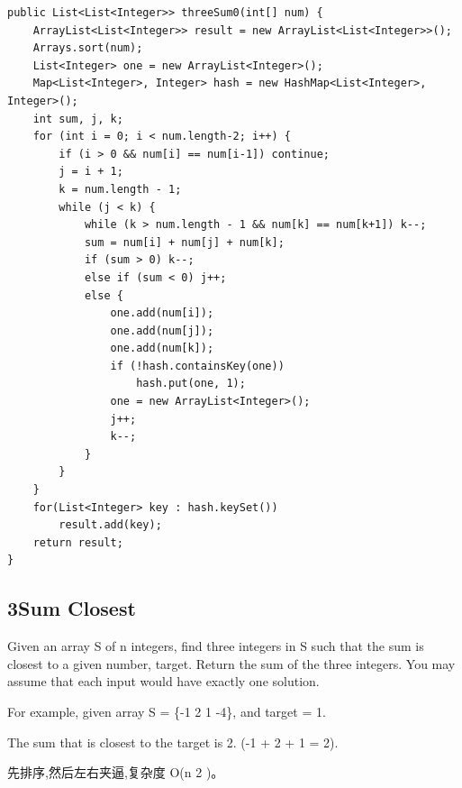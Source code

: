 \documentclass[12pt]{book}
\begin{document}
\lstset{language=java,label= ,caption= ,numbers=none}
\begin{lstlisting}
public List<List<Integer>> threeSum0(int[] num) {
    ArrayList<List<Integer>> result = new ArrayList<List<Integer>>();
    Arrays.sort(num);  
    List<Integer> one = new ArrayList<Integer>();
    Map<List<Integer>, Integer> hash = new HashMap<List<Integer>, Integer>();
    int sum, j, k;
    for (int i = 0; i < num.length-2; i++) {
        if (i > 0 && num[i] == num[i-1]) continue;
        j = i + 1;
        k = num.length - 1;
        while (j < k) {
            while (k > num.length - 1 && num[k] == num[k+1]) k--;
            sum = num[i] + num[j] + num[k];
            if (sum > 0) k--;
            else if (sum < 0) j++;
            else {
                one.add(num[i]);
                one.add(num[j]);
                one.add(num[k]);
                if (!hash.containsKey(one))
                    hash.put(one, 1);
                one = new ArrayList<Integer>();
                j++;
                k--;
            }
        }
    }
    for(List<Integer> key : hash.keySet()) 
        result.add(key);
    return result;
}
\end{lstlisting}

\subsection{3Sum Closest}
\label{sec-15-2-2}
Given an array S of n integers, find three integers in S such that the sum is closest to a given number, target. Return the sum of the three integers. You may assume that each input would have exactly one solution.

For example, given array S = \{-1 2 1 -4\}, and target = 1.

The sum that is closest to the target is 2. (-1 + 2 + 1 = 2).

先排序,然后左右夹逼,复杂度 O(n 2 )。
\end{document}
